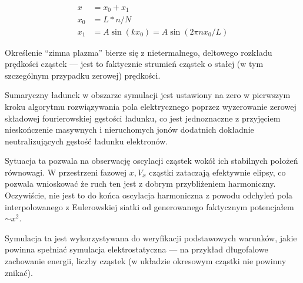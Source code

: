 \begin{align}
x &= x_0 + x_1\\
x_0 &= L * n / N\\
x_1 &= A  \sin(k x_0) = A \sin(2 \pi n x_0 / L)
\end{align}

Określenie ``zimna plazma'' bierze się z nietermalnego, deltowego
rozkładu prędkości cząstek --- jest to faktycznie strumień cząstek o stałej
(w tym szczególnym przypadku zerowej) prędkości.

Sumaryczny ładunek w obszarze symulacji jest ustawiony na zero w pierwszym
kroku algorytmu rozwiązywania pola elektrycznego poprzez wyzerowanie zerowej
składowej fourierowskiej gęstości ładunku, co jest jednoznaczne z przyjęciem
nieskończenie masywnych i nieruchomych jonów dodatnich dokładnie
neutralizujących gęstość ładunku elektronów.

Sytuacja ta
pozwala na obserwację oscylacji cząstek wokół ich stabilnych położeń
równowagi. W przestrzeni fazowej $x, V_x$ cząstki zataczają efektywnie
elipsy, co pozwala wnioskować że ruch ten jest z dobrym przybliżeniem harmoniczny.
Oczywiście, nie jest to do końca oscylacja harmoniczna z powodu odchyleń pola interpolowanego
z Eulerowskiej siatki od generowanego faktycznym potencjałem $ \sim x^2 $.


Symulacja ta jest wykorzystywana do weryfikacji podstawowych warunków, jakie powinna spełniać
symulacja elektrostatyczna --- na przykład długofalowe zachowanie energii, liczby cząstek (w układzie okresowym cząstki nie powinny
znikać).

